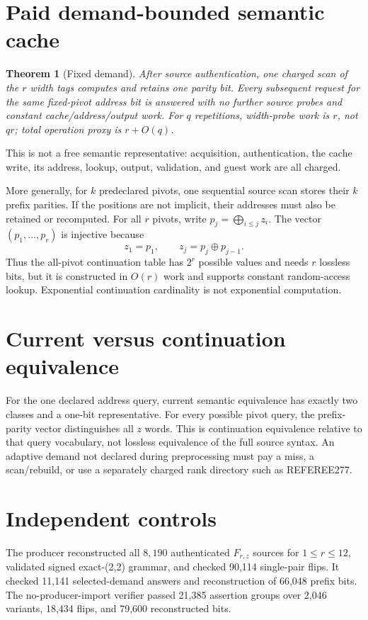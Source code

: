 \documentclass[11pt]{article}
\newtheorem{theorem}{Theorem}
\begin{document}
\section{Paid demand-bounded semantic cache}
\begin{theorem}[Fixed demand]
After source authentication, one charged scan of the $r$ width tags computes
and retains one parity bit. Every subsequent request for the same fixed-pivot
address bit is answered with no further source probes and constant
cache/address/output work. For $q$ repetitions, width-probe work is $r$, not
$qr$; total operation proxy is $r+O(q)$.
\end{theorem}
This is not a free semantic representative: acquisition, authentication,
the cache write, its address, lookup, output, validation, and guest work are
all charged.

More generally, for $k$ predeclared pivots, one sequential source scan stores
their $k$ prefix parities. If the positions are not implicit, their addresses
must also be retained or recomputed. For all $r$ pivots, write
$p_j=\bigoplus_{i\le j}z_i$. The vector $(p_1,\ldots,p_r)$ is injective because
\[
 z_1=p_1,\qquad z_j=p_j\oplus p_{j-1}.                        \tag{3}
\]
Thus the all-pivot continuation table has $2^r$ possible values and needs
$r$ lossless bits, but it is constructed in $O(r)$ work and supports constant
random-access lookup. Exponential continuation cardinality is not
exponential computation.

\section{Current versus continuation equivalence}
For the one declared address query, current semantic equivalence has exactly
two classes and a one-bit representative. For every possible pivot query,
the prefix-parity vector distinguishes all $z$ words. This is continuation
equivalence relative to that query vocabulary, not lossless equivalence of the
full source syntax. An adaptive demand not declared during preprocessing must
pay a miss, a scan/rebuild, or use a separately charged rank directory such as
REFEREE277.

\section{Independent controls}
The producer reconstructed all $8{,}190$ authenticated $F_{r,z}$ sources for
$1\le r\le12$, validated signed exact-(2,2) grammar, and checked 90,114
single-pair flips. It checked 11,141 selected-demand answers and reconstruction
of 66,048 prefix bits. The no-producer-import verifier passed 21,385 assertion
groups over 2,046 variants, 18,434 flips, and 79,600 reconstructed bits.
\end{document}
